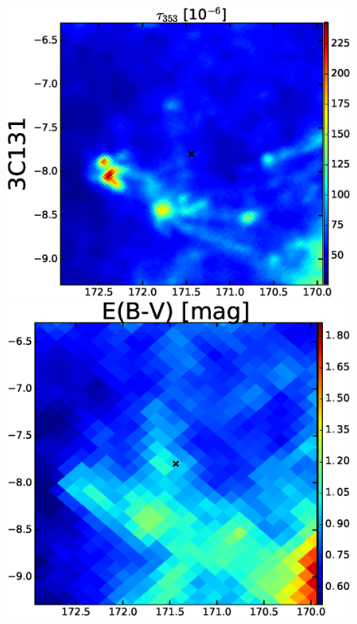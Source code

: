 \documentclass[preprint]{emulateapj}
\begin{document}
\begin{figure}[h!]
\centering     
\includegraphics[scale=0.23]{fig/src_eg_apd0_r0c0.eps}
\includegraphics[scale=0.21]{fig/src_eg_apd0_r0c1.eps}

\end{figure}
\end{document}

